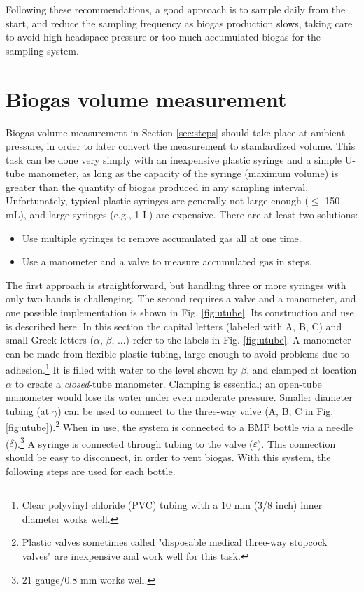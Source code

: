 \documentclass[]{article}
\begin{document}
Following these recommendations, a good approach is to sample daily from the start, and reduce the sampling frequency as biogas production slows, taking care to avoid high headspace pressure or too much accumulated biogas for the sampling system.

\section{Biogas volume measurement}
\label{sec:volmeas}
Biogas volume measurement in Section \ref{sec:steps} should take place at ambient pressure, in order to later convert the measurement to standardized volume.
This task can be done very simply with an inexpensive plastic syringe and a simple U-tube manometer, as long as the capacity of the syringe (maximum volume) is greater than the quantity of biogas produced in any sampling interval.
Unfortunately, typical plastic syringes are generally not large enough ($\le$ 150 mL), and large syringes (e.g., 1 L) are expensive.
There are at least two solutions:
\begin{itemize}
  \item Use multiple syringes to remove accumulated gas all at one time. %
  \item Use a manometer and a valve to measure accumulated gas in steps. 
\end{itemize}

The first approach is straightforward, but handling three or more syringes with only two hands is challenging.
The second requires a valve and a manometer, and one possible implementation is shown in Fig. \ref{fig:utube}.
Its construction and use is described here.
In this section the capital letters (labeled with A, B, C) and small Greek letters ($\alpha$, $\beta$, ...) refer to the labels in Fig. \ref{fig:utube}.
A manometer can be made from flexible plastic tubing, large enough to avoid problems due to adhesion.\footnote{Clear polyvinyl chloride (PVC) tubing with a 10 mm (3/8 inch) inner diameter works well.}
It is filled with water to the level shown by $\beta$, and clamped at location $\alpha$ to create a \textit{closed}-tube manometer.
Clamping is essential; an open-tube manometer would lose its water under even moderate pressure.
Smaller diameter tubing (at $\gamma$) can be used to connect to the three-way valve (A, B, C in Fig. \ref{fig:utube}).\footnote{Plastic valves sometimes called "disposable medical three-way stopcock valves" are inexpensive and work well for this task.}
When in use, the system is connected to a BMP bottle via a needle ($\delta$).\footnote{21 gauge/0.8 mm works well.}
A syringe is connected through tubing to the valve ($\varepsilon$).
This connection should be easy to disconnect, in order to vent biogas.
With this system, the following steps are used for each bottle.
\end{document}
